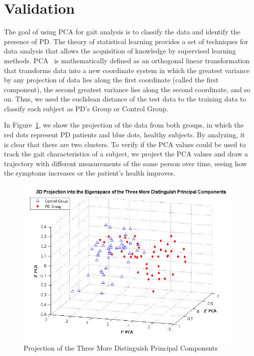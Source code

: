 \documentclass[10pt, conference, compsocconf]{IEEEtran}
\begin{document}
\section{Validation}\label{sec:results}

The goal of using PCA for gait analysis is to classify the data and identify the presence of PD. The theory of statistical learning provides a set of techniques for data analysis that allows the acquisition of knowledge by supervised learning methods. PCA~\cite{Shlens05atutorial} is mathematically defined as an orthogonal linear transformation that transforms data into a new coordinate system in which the greatest variance by any projection of data lies along the first coordinate (called the first component), the second greatest variance lies along the second coordinate, and so on. Thus, we used the euclidean distance of the test data to the training data to classify each subject as PD's Group or Control Group. 

In Figure~\ref{fig:projecaopcaparkinson},  we show the projection of the data from both groups, in which the red dots represent PD patients and blue dots, healthy subjects. By analyzing, it is clear that there are two clusters. To verify if the PCA values could be used to track the gait characteristics of a subject, we project the PCA values and draw a trajectory with different measurements of the same person over time, seeing how the symptoms increases or the patient's health improves.

\begin{figure}
  \centering
  \includegraphics[scale=0.45]{./img/projection-eigenspace.png}
  \caption{Projection of the Three More Distinguish Principal Components}
  \label{fig:projecaopcaparkinson}
\end{figure}
\end{document}
